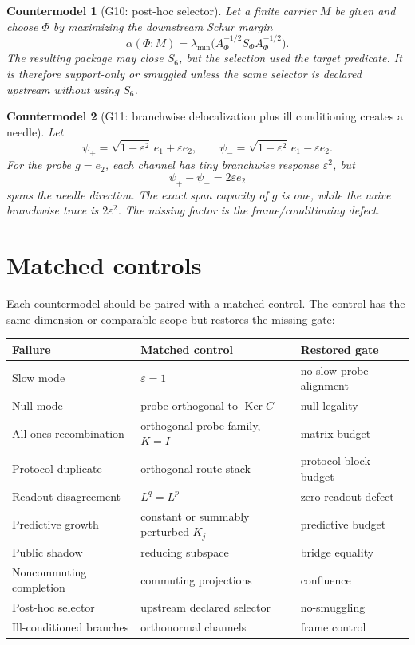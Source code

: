 \documentclass[11pt]{article}
\newtheorem{countermodel}{Countermodel}
\newcommand{\Ker}{\operatorname{Ker}}
\begin{document}
\begin{countermodel}[G10: post-hoc selector]
Let a finite carrier \(M\) be given and choose \(\Phi\) by maximizing the downstream Schur margin
\[
  \alpha(\Phi;M)=\lambda_{\min}\bigl(A_\Phi^{-1/2}S_\Phi A_\Phi^{-1/2}\bigr).
\]
The resulting package may close \(S_6\), but the selection used the target predicate.  It is therefore support-only or smuggled unless the same selector is declared upstream without using \(S_6\).
\end{countermodel}

\begin{countermodel}[G11: branchwise delocalization plus ill conditioning creates a needle]
Let
\[
  \psi_+=\sqrt{1-\varepsilon^2}\,e_1+\varepsilon e_2,
  \qquad
  \psi_- =\sqrt{1-\varepsilon^2}\,e_1-\varepsilon e_2.
\]
For the probe \(g=e_2\), each channel has tiny branchwise response \(\varepsilon^2\), but
\[
  \psi_+-\psi_-=2\varepsilon e_2
\]
spans the needle direction.  The exact span capacity of \(g\) is one, while the naive branchwise trace is \(2\varepsilon^2\).  The missing factor is the frame/conditioning defect.
\end{countermodel}

\section{Matched controls}
Each countermodel should be paired with a matched control.  The control has the same dimension or comparable scope but restores the missing gate:
\begin{center}
\begin{tabular}{lll}
\toprule
Failure & Matched control & Restored gate\\
\midrule
Slow mode & \(\varepsilon=1\) & no slow probe alignment\\
Null mode & probe orthogonal to \(\Ker C\) & null legality\\
All-ones recombination & orthogonal probe family, \(K=I\) & matrix budget\\
Protocol duplicate & orthogonal route stack & protocol block budget\\
Readout disagreement & \(L^q=L^p\) & zero readout defect\\
Predictive growth & constant or summably perturbed \(K_j\) & predictive budget\\
Public shadow & reducing subspace & bridge equality\\
Noncommuting completion & commuting projections & confluence\\
Post-hoc selector & upstream declared selector & no-smuggling\\
Ill-conditioned branches & orthonormal channels & frame control\\
\bottomrule
\end{tabular}
\end{center}
\end{document}
